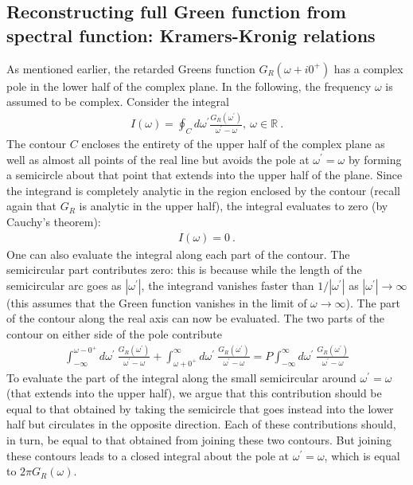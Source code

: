 \documentclass[reprint,hidelinks,onecolumn]{revtex4-2}
\begin{document}
\subsection{Reconstructing full Green function from spectral function: Kramers-Kronig relations}
As mentioned earlier, the retarded Greens function \(G_R(\omega + i 0^+)\) has a complex pole in the lower half of the complex plane. In the following, the frequency \(\omega\) is assumed to be complex. Consider the integral
\begin{equation}\begin{aligned}
	I(\omega) = \oint_C d\omega^\prime \frac{G_R(\omega^\prime)}{\omega^\prime - \omega},~\omega \in \mathbb{R}~.
\end{aligned}\end{equation}
The contour \(C\) encloses the entirety of the upper half of the complex plane as well as almost all points of the real line but avoids the pole at \(\omega^\prime = \omega\) by forming a semicircle about that point that extends into the upper half of the plane. Since the integrand is completely analytic in the region enclosed by the contour (recall again that \(G_R\) is analytic in the upper half), the integral evaluates to zero (by Cauchy's theorem):
\begin{equation}\begin{aligned}\label{zerointegral}
	I(\omega) = 0~.
\end{aligned}\end{equation}
One can also evaluate the integral along each part of the contour. The semicircular part contributes zero: this is because while the length of the semicircular arc goes as \(|\omega^\prime|\), the integrand vanishes faster than \(1/|\omega^\prime|\) as \(|\omega^\prime| \to \infty\) (this assumes that the Green function vanishes in the limit of \(\omega \to \infty\)). The part of the contour along the real axis can now be evaluated. The two parts of the contour on either side of the pole contribute
\begin{equation}\begin{aligned}
	\int_{-\infty}^{\omega - 0^+}d\omega^\prime~\frac{G_R(\omega^\prime)}{\omega^\prime - \omega} + \int_{\omega + 0^+}^{\infty}d\omega^\prime~\frac{G_R(\omega^\prime)}{\omega^\prime - \omega} = P\int_{-\infty}^{\infty}d\omega^\prime~\frac{G_R(\omega^\prime)}{\omega^\prime - \omega}
\end{aligned}\end{equation}
To evaluate the part of the integral along the small semicircular around \(\omega^\prime = \omega\) (that extends into the upper half), we argue that this contribution should be equal to that obtained by taking the semicircle that goes instead into the lower half but circulates in the opposite direction. Each of these contributions should, in turn, be equal to that obtained from joining these two contours. But joining these contours leads to a closed integral about the pole at \(\omega^\prime = \omega\), which is equal to \(2\pi G_R(\omega)\).
\end{document}
